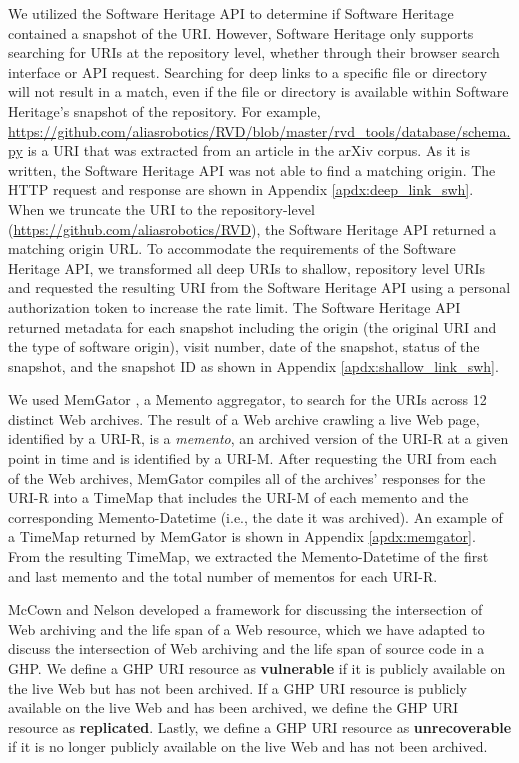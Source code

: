 We utilized the Software Heritage API \cite{swh-api} to determine if Software Heritage contained a snapshot of the URI. However, Software Heritage only supports searching for URIs at the repository level, whether through their browser search interface or API request. Searching for deep links to a specific file or directory will not result in a match, even if the file or directory is available within Software Heritage's snapshot of the repository. For example, \url{https://github.com/aliasrobotics/RVD/blob/master/rvd\_tools/database/schema.py} is a URI that was extracted from an article in the arXiv corpus. As it is written, the Software Heritage API was not able to find a matching origin. The HTTP request and response are shown in Appendix \ref{apdx:deep_link_swh}. When we truncate the URI to the repository-level (\url{https://github.com/aliasrobotics/RVD}), the Software Heritage API returned a matching origin URL. To accommodate the requirements of the Software Heritage API, we transformed all deep URIs to shallow, repository level URIs and requested the resulting URI from the Software Heritage API using a personal authorization token to increase the rate limit. The Software Heritage API returned metadata for each snapshot including the origin (the original URI and the type of software origin), visit number, date of the snapshot, status of the snapshot, and the snapshot ID \cite{dicosmo-ipres2017} as shown in Appendix \ref{apdx:shallow_link_swh}. 

We used MemGator \cite{jcdl-alam-memgator}, a Memento \cite{RFC7089} aggregator, to search for the URIs across 12 distinct Web archives. The result of a Web archive crawling a live Web page, identified by a URI-R, is a \emph{memento}, an archived version of the URI-R at a given point in time and is identified by a URI-M. After requesting the URI from each of the Web archives, MemGator compiles all of the archives' responses for the URI-R into a TimeMap that includes the URI-M of each memento and the corresponding Memento-Datetime (i.e., the date it was archived). An example of a TimeMap returned by MemGator is shown in Appendix \ref{apdx:memgator}. From the resulting TimeMap, we extracted the Memento-Datetime of the first and last memento and the total number of mementos for each URI-R.   

McCown and Nelson \cite{mccown-jcdl2009} developed a framework for discussing the intersection of Web archiving and the life span of a Web resource, which we have adapted to discuss the intersection of Web archiving and the life span of source code in a GHP. We define a GHP URI resource as \textbf{vulnerable} if it is publicly available on the live Web but has not been archived. If a GHP URI resource is publicly available on the live Web and has been archived, we define the GHP URI resource as \textbf{replicated}. Lastly, we define a GHP URI resource as \textbf{unrecoverable} if it is no longer publicly available on the live Web and has not been archived. 

